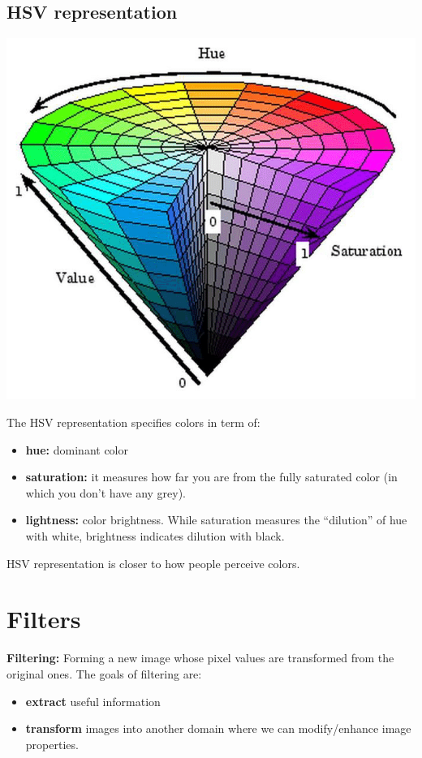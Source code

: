 \subsection{HSV representation}
\begin{center}
    \includegraphics[scale = 0.3]{images/HSV.png}
\end{center}
The HSV representation specifies colors in term of:
\begin{itemize}
    \item \textbf{hue:} dominant color
    \item \textbf{saturation:} it measures how far you are from the fully saturated color (in which you don't have any grey).
    \item \textbf{lightness:} color brightness. While saturation measures the “dilution” of hue with white, brightness indicates dilution with black.
\end{itemize}
HSV representation is closer to how people perceive colors.

\section{Filters}
\textbf{Filtering:} Forming a new image whose pixel values are transformed from the original ones.\newline
The goals of filtering are:
\begin{itemize}
    \item \textbf{extract} useful information
    \item \textbf{transform} images into another domain where we can modify/enhance image properties.
\end{itemize}
